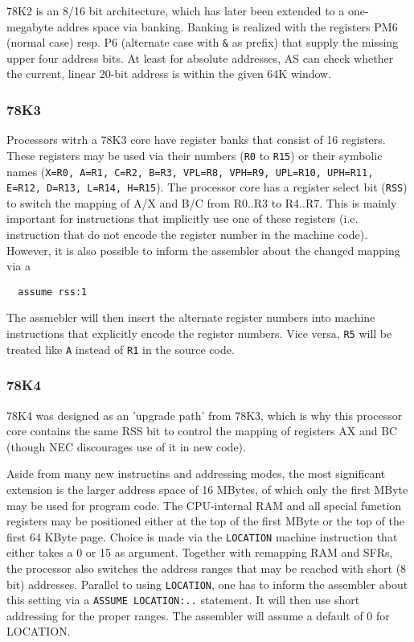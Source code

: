 \documentclass[12pt,twoside]{report}
\newcommand{\tty}[1]{{\tt #1}}
\newcommand{\asname}{{AS}}
\begin{document}
78K2 is an 8/16 bit architecture, which has later been extended to a
one-megabyte addres space via banking.  Banking is realized with the
registers PM6 (normal case) resp. P6 (alternate case with \verb!&! as
prefix) that supply the missing upper four address bits.  At least for
absolute addresses, \asname{} can check whether the current, linear 20-bit
address is within the given 64K window.


\subsubsection{78K3}

Processors witrh a 78K3 core have register banks that consist of
16 registers.  These registers may be used via their numbers
(\tty{R0} to \tty{R15}) or their symbolic names (\tty{X=R0, A=R1,
C=R2, B=R3, VPL=R8, VPH=R9, UPL=R10, UPH=R11, E=R12,
D=R13, L=R14, H=R15}).  The processor core has a register select
bit (\tty{RSS}) to switch the mapping of A/X and B/C from R0..R3
to R4..R7.  This is mainly important for instructions that
implicitly use one of these registers (i.e. instruction that do
not encode the register number in the machine code).  However, it
is also possible to inform the assembler about the changed
mapping via a

\begin{verbatim}
  assume rss:1
\end{verbatim}

The assmebler will then insert the alternate register numbers
into machine instructions that explicitly encode the register
numbers.  Vice versa, \tty{R5} will be treated like \tty{A} instead
of \tty{R1} in the source code.


\subsubsection{78K4}

78K4 was designed as an 'upgrade path' from 78K3, which is why
this processor core contains the same RSS bit to control the
mapping of registers AX and BC (though NEC discourages use of it
in new code).

Aside from many new instructins and addressing modes, the most
significant extension is the larger address space of 16 MBytes,
of which only the first MByte may be used for program code.  The
CPU-internal RAM and all special function registers may be
positioned either at the top of the first MByte or the top of the
first 64 KByte page.  Choice is made via the \tty{LOCATION}
machine instruction that either takes a 0 or 15 as argument. 
Together with remapping RAM and SFRs, the processor also switches
the address ranges that may be reached with short (8 bit)
addresses.  Parallel to using \tty{LOCATION}, one has to inform
the assembler about this setting via a \tty{ASSUME LOCATION:..}
statement.  It will then use short addressing for the proper
ranges.  The assembler will assume a default of 0 for LOCATION.
\end{document}
